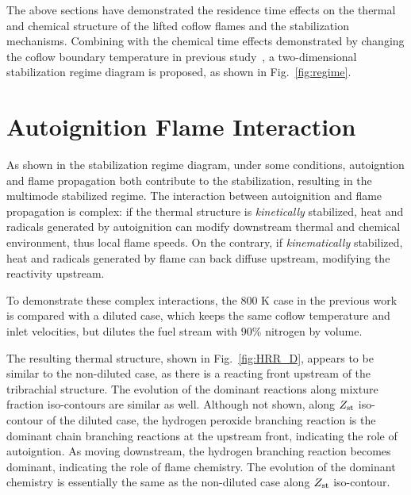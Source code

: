 \documentclass{wssci}
\begin{document}
The above sections have demonstrated the residence time effects on the thermal and chemical structure of the lifted coflow flames and the stabilization mechanisms.  Combining with the chemical time effects demonstrated by changing the coflow boundary temperature in previous study~\cite{deng15}, a two-dimensional stabilization regime diagram is proposed, as shown in Fig.~\ref{fig:regime}.  
         

\section{Autoignition Flame Interaction}

As shown in the stabilization regime diagram, under some conditions, autoigntion and flame propagation both contribute to the stabilization, resulting in the multimode stabilized regime.  The interaction between autoignition and flame propagation is complex: if the thermal structure is \emph{kinetically} stabilized, heat and radicals generated by autoignition can modify downstream thermal and chemical environment, thus local flame speeds.  On the contrary, if \emph{kinematically} stabilized, heat and radicals generated by flame can back diffuse upstream, modifying the reactivity upstream.  

To demonstrate these complex interactions, the $800$ K case in the previous work~\cite{deng15} is compared with a diluted case, which keeps the same coflow temperature and inlet velocities, but dilutes the fuel stream with $90$\% nitrogen by volume.  

The resulting thermal structure, shown in Fig.~\ref{fig:HRR_D}, appears to be similar to the non-diluted case, as there is a reacting front upstream of the tribrachial structure.  The evolution of the dominant reactions along mixture fraction iso-contours are similar as well.  Although not shown, along $Z_{\rm st}$ iso-contour of the diluted case, the hydrogen peroxide branching reaction is the dominant chain branching reactions at the upstream front, indicating the role of autoigntion.  As moving downstream, the hydrogen branching reaction becomes dominant, indicating the role of flame chemistry.  The evolution of the dominant chemistry is essentially the same as the non-diluted case along $Z_{\rm st}$ iso-contour.
\end{document}
